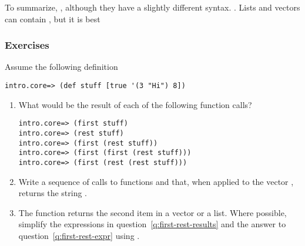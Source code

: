 To summarize, , although they have a slightly different syntax.  . Lists and vectors can contain , but it is best 

\subsubsection{Exercises}\label{subsub:lists-vectors-exercises}
\begin{exercise}\label{ex:lists-vectors}
Assume the following definition
\begin{framed}
\begin{verbatim}
intro.core=> (def stuff [true '(3 "Hi") 8])
\end{verbatim}
\end{framed}
\begin{enumerate}
\item\label{q:first-rest-results} What would be the result of each of the following function calls? 
\begin{framed}
\begin{verbatim}
intro.core=> (first stuff)
intro.core=> (rest stuff)
intro.core=> (first (rest stuff))
intro.core=> (first (first (rest stuff)))
intro.core=> (first (rest (rest stuff)))
\end{verbatim}
\end{framed}
\item\label{q:first-rest-expr} Write a sequence of calls to functions  and  that, when applied to the vector , returns the string . 
\item\label{q:second} The function  returns the second item in a vector or a list. Where possible, simplify the expressions in question~\ref{q:first-rest-results} and the answer to question~\ref{q:first-rest-expr} using .
\end{enumerate}
\end{exercise}

